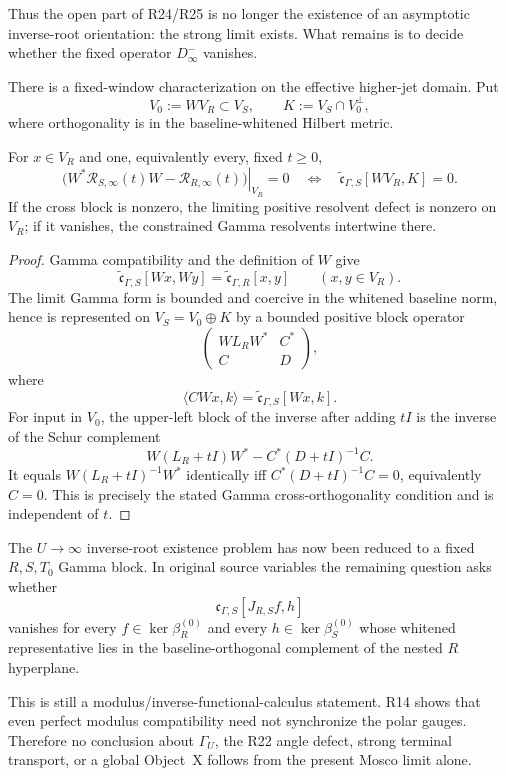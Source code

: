 Thus the open part of R24/R25 is no longer the existence of an asymptotic inverse-root
orientation: the strong limit exists.  What remains is to decide whether the fixed
operator $D_\infty^-$ vanishes.

There is a fixed-window characterization on the effective higher-jet domain.  Put
\[
 V_0:=WV_R\subset V_S,
 \qquad
 K:=V_S\cap V_0^\perp,
\]
where orthogonality is in the baseline-whitened Hilbert metric.

\begin{proposition}
\label{prop:o3z-gamma-block}
For $x\in V_R$ and one, equivalently every, fixed $t\ge0$,
\[
 \boxed{
 \left.
 \bigl(W^*\mathcal R_{S,\infty}(t)W
       -\mathcal R_{R,\infty}(t)\bigr)
 \right|_{V_R}=0
 \quad\Longleftrightarrow\quad
 \widetilde{\mathfrak c}_{\Gamma,S}[WV_R,K]=0.
 }
\tag{O3Z.14}\label{eq:o3z-gamma-block}
\]
If the cross block is nonzero, the limiting positive resolvent defect is nonzero on
$V_R$; if it vanishes, the constrained Gamma resolvents intertwine there.
\end{proposition}

\begin{proof}
Gamma compatibility and the definition of $W$ give
\[
 \widetilde{\mathfrak c}_{\Gamma,S}[Wx,Wy]
 =\widetilde{\mathfrak c}_{\Gamma,R}[x,y]
 \qquad(x,y\in V_R).
\tag{O3Z.15}\label{eq:o3z-gamma-compat}
\]
The limit Gamma form is bounded and coercive in the whitened baseline norm, hence is
represented on $V_S=V_0\oplus K$ by a bounded positive block operator
\[
 \begin{pmatrix}
 W L_RW^*&C^*\\
 C&D
 \end{pmatrix},
\]
where
\[
 \langle CWx,k\rangle
 =\widetilde{\mathfrak c}_{\Gamma,S}[Wx,k].
\]
For input in $V_0$, the upper-left block of the inverse after adding $tI$ is the inverse
of the Schur complement
\[
 W(L_R+tI)W^*-C^*(D+tI)^{-1}C.
\]
It equals $W(L_R+tI)^{-1}W^*$ identically iff
$C^*(D+tI)^{-1}C=0$, equivalently $C=0$.  This is precisely the stated Gamma
cross-orthogonality condition and is independent of $t$.
\end{proof}

\begin{remark}
\label{rem:o3z-firewall}
The $U\to\infty$ inverse-root existence problem has now been reduced to a fixed
$R,S,T_0$ Gamma block.  In original source variables the remaining question asks
whether
\[
 \mathfrak c_{\Gamma,S}[J_{R,S}f,h]
\]
vanishes for every $f\in\ker\beta_R^{(0)}$ and every
$h\in\ker\beta_S^{(0)}$ whose whitened representative lies in the baseline-orthogonal
complement of the nested $R$ hyperplane.

This is still a modulus/inverse-functional-calculus statement.  R14 shows that even
perfect modulus compatibility need not synchronize the polar gauges.  Therefore no
conclusion about $\Gamma_U$, the R22 angle defect, strong terminal transport, or a
global Object~X follows from the present Mosco limit alone.
\end{remark}

